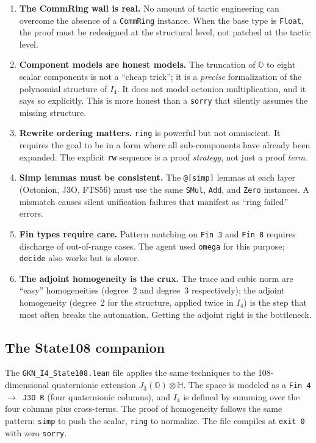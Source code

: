 \documentclass[11pt]{article}
\theoremstyle{definition}
\newcommand{\OO}{\mathbb{O}}
\newcommand{\HH}{\mathbb{H}}
\newcommand{\Jthree}{J_3(\OO)}
\newcommand{\Iq}{I_4}
\begin{document}
\begin{enumerate}[leftmargin=2em]
\item \textbf{The CommRing wall is real.} No amount of tactic
engineering can overcome the absence of a \texttt{CommRing} instance.
When the base type is \texttt{Float}, the proof must be redesigned at the
structural level, not patched at the tactic level.

\item \textbf{Component models are honest models.} The truncation of
$\OO$ to eight scalar components is not a ``cheap trick''; it is a
\emph{precise} formalization of the polynomial structure of $\Iq$. It
does not model octonion multiplication, and it says so explicitly. This
is more honest than a \texttt{sorry} that silently assumes the missing
structure.

\item \textbf{Rewrite ordering matters.} \texttt{ring} is powerful but
not omniscient. It requires the goal to be in a form where all
sub-components have already been expanded. The explicit \texttt{rw}
sequence is a proof \emph{strategy}, not just a proof \emph{term}.

\item \textbf{Simp lemmas must be consistent.} The \texttt{@[simp]}
lemmas at each layer (Octonion, J3O, FTS56) must use the same
\texttt{SMul}, \texttt{Add}, and \texttt{Zero} instances. A mismatch
causes silent unification failures that manifest as ``ring failed''
errors.

\item \textbf{Fin types require care.} Pattern matching on \texttt{Fin 3}
and \texttt{Fin 8} requires discharge of out-of-range cases. The agent
used \texttt{omega} for this purpose; \texttt{decide} also works but is
slower.

\item \textbf{The adjoint homogeneity is the crux.} The trace and cubic
norm are ``easy'' homogeneities (degree~2 and degree~3 respectively);
the adjoint homogeneity (degree~2 for the structure, applied twice in
$\Iq$) is the step that most often breaks the automation. Getting the
adjoint right is the bottleneck.
\end{enumerate}

\subsection{The State108 companion}
\label{sec:agent-state108}

The \texttt{GKN\_I4\_State108.lean} file applies the same techniques to
the 108-dimensional quaternionic extension $\Jthree\otimes\HH$. The
space is modeled as a \texttt{Fin 4 $\to$ J3O R} (four quaternionic
columns), and $\Iq$ is defined by summing over the four columns plus
cross-terms. The proof of homogeneity follows the same pattern:
\texttt{simp} to push the scalar, \texttt{ring} to normalize. The file
compiles at \texttt{exit 0} with zero \texttt{sorry}.
\end{document}
